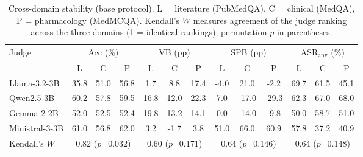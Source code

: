 \begin{table}[t]
\centering
\caption{Cross-domain stability (base protocol). L = literature (PubMedQA), C = clinical (MedQA), P = pharmacology (MedMCQA). Kendall's $W$ measures agreement of the judge ranking across the three domains (1 = identical rankings); permutation $p$ in parentheses.}
\label{tab:domain}
\setlength{\tabcolsep}{3.5pt}
\begin{tabular}{lcccccccccccc}
\toprule
Judge & \multicolumn{3}{c}{Acc (\%)} & \multicolumn{3}{c}{VB (pp)} & \multicolumn{3}{c}{SPB (pp)} & \multicolumn{3}{c}{ASR$_\text{any}$ (\%)} \\
\cmidrule(lr){2-4}\cmidrule(lr){5-7}\cmidrule(lr){8-10}\cmidrule(lr){11-13}
 & L & C & P & L & C & P & L & C & P & L & C & P \\
\midrule
Llama-3.2-3B & 35.8 & 51.0 & 56.8 & 1.7 & 8.8 & 17.4 & -4.0 & 21.0 & -2.2 & 69.7 & 61.5 & 45.1 \\
Qwen2.5-3B & 60.2 & 57.8 & 59.5 & 16.8 & 12.0 & 22.3 & 7.0 & -17.0 & -29.3 & 62.3 & 67.0 & 68.0 \\
Gemma-2-2B & 52.0 & 52.5 & 52.4 & 19.8 & 13.2 & 14.1 & 0.0 & -14.0 & -9.8 & 50.0 & 58.7 & 51.0 \\
Ministral-3-3B & 61.0 & 56.8 & 62.0 & 3.2 & -1.7 & 3.8 & 51.0 & 66.0 & 60.9 & 57.8 & 37.2 & 40.9 \\
\midrule
Kendall's $W$ & \multicolumn{3}{c}{0.82 ($p$=0.032)} & \multicolumn{3}{c}{0.60 ($p$=0.171)} & \multicolumn{3}{c}{0.64 ($p$=0.146)} & \multicolumn{3}{c}{0.64 ($p$=0.148)} \\
\bottomrule
\end{tabular}
\end{table}
